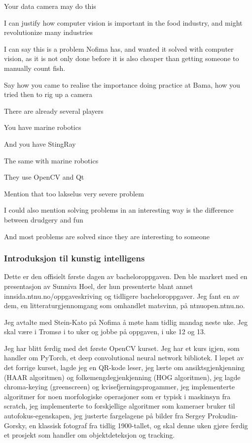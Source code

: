 Your data camera may do this

I can justify how computer vision is important in the food industry, and might revolutionize many industries

I can say this is a problem Nofima has, and wanted it solved with computer vision, as it is not only done before it is also cheaper than getting someone to manually count fish.

Say how you came to realise the importance doing practice at Bama, how you tried then to rig up a camera

There are already several players

You have marine robotics

And you have StingRay

The same with marine robotics

They use OpenCV and Qt

Mention that too lakselus very severe problem

I could also mention solving problems in an interesting way is the difference between drudgery and fun

And most problems are solved since they are interesting to someone


\subsubsection{Introduksjon til kunstig intelligens}

Dette er den offisielt første dagen av bacheloroppgaven. Den ble markert med en presentasjon av Sunniva Hoel, der hun presenterte blant annet innsida.ntnu.no/oppgaveskriving og tidligere bacheloroppgaver. Jeg fant en av dem, en litteraturgjennomgang som omhandlet matsvinn, på ntnuopen.ntnu.no.

Jeg avtalte med Stein-Kato på Nofima å møte ham tidlig mandag neste uke. Jeg skal være i Tromsø i to uker og jobbe på oppgaven, i uke 12 og 13.

Jeg har blitt ferdig med det første OpenCV kurset. Jeg har et kurs igjen, som handler om PyTorch, et deep convolutional neural network bibliotek. I løpet av det forrige kurset, lagde jeg en QR-kode leser, jeg lærte om ansiktsgjenkjenning (HAAR algoritmen) og folkemengdegjenkjenning (HOG algoritmen), jeg lagde chroma-keying (greenscreen) og kvisefjerningsprogammer, jeg implementerte algoritmer for noen morfologiske operasjoner som er typisk i maskinsyn fra scratch, jeg implementerte to forskjellige algoritmer som kameraer bruker til autofokus-egenskapen, jeg justerte fargelagene på bilder fra Sergey Prokudin-Gorsky, en klassisk fotograf fra tidlig 1900-tallet, og skal denne uken gjøre ferdig et prosjekt som handler om objektdeteksjon og tracking.

